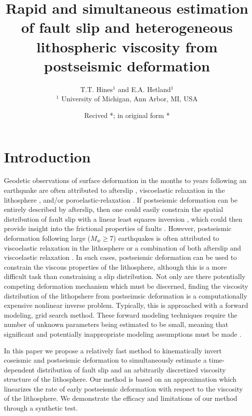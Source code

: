 \documentclass[extra,mreferee]{gji}
\title{Rapid and simultaneous estimation of fault slip and
  heterogeneous lithospheric viscosity from postseismic deformation}
\author[T.T. Hines and E.A Hetland]{T.T. Hines$^1$ and E.A. Hetland$^1$\\
                    $^1$ University of Michigan, 
                         Ann Arbor, MI, USA}
\date{Recived *; in original form *}
\begin{document}
\label{firstpage}

\maketitle

\begin{summary}
\end{summary}

\begin{keywords}
\end{keywords}

\section{Introduction}
Geodetic observations of surface deformation in the months to years
following an earthquake are often attributed to afterslip
\citep[e.g.][]{M1991}, viscoelastic relaxation in the lithosphere
\citep[e.g.][]{NM1974}, and/or poroelastic-relaxation
\citep[e.g.][]{P1998,J2003}.  If postseismic deformation can be
entirely described by afterslip, then one could easily constrain the
spatial distribution of fault slip with a linear least squares
inversion \citep[e.g.][]{H1987,B2002,F2007}, which could then provide
insight into the frictional properties of faults
\citep[e.g.][]{H2006,B2009}.  However, postseismic deformation
following large ($M_w\geq$7) earthquakes is often attributed to
viscoelastic relaxation in the lithosphere
\citep[e.g.][]{HH2003,P2003,P2005} or a combination of both afterslip
and viscoelastic relaxation \citep[e.g.][]{F2006,H2008,J2009,R2015}.
In such cases, postseismic deformation can be used to constrain the
viscous properties of the lithosphere, although this is a more
difficult task than constraining a slip distribution.  Not only are
there potentially competing deformation mechanism which must be
discerned, finding the viscosity distribution of the lithopshere from
postseimsic deformation is a computationally expensive nonlinear
inverse problem.  Typically, this is approached with a forward
modeling, grid search method.  These forward modeling techniques
require the number of unknown parameters being estimated to be small,
meaning that significant and potentially inappropriate modeling
assumptions must be made \citep{RG2008,H2013}.

In this paper we propose a relatively fast method to kinematically
invert coseismic and postseismic deformation to simultaneously
estimate a time-dependent distribution of fault slip and an
arbitrarily discretized viscosity structure of the lithosphere.  Our
method is based on an approximation which linearizes the rate of early
postseismic deformation with respect to the viscosity of the
lithosphere.  We demonstrate the efficacy and limitations of our
method through a synthetic test.
\end{document}
